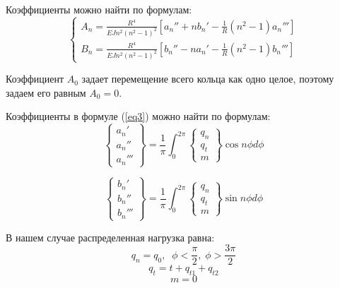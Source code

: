 Коэффициенты можно найти по формулам:
\begin{equation}
    \label{eq3}
    \begin{cases}
        \displaystyle A_n = \frac{R^4}{EJn^2(n^2-1)^2} \left[ a_n'' + nb_n' - \frac{1}{R}(n^2 - 1)a_n''' \right]
        \\[10pt]
        \displaystyle B_n = \frac{R^4}{EJn^2(n^2 - 1)^2} \left[ b_n'' - na_n' - \frac{1}{R}(n^2 - 1)b_n''' \right]
    \end{cases}
\end{equation}

Коэффициент $A_0$ задает перемещение всего кольца как одно целое, поэтому задаем его равным $A_0 = 0$.

Коэффициенты в формуле (\ref{eq3}) можно найти по формулам:
\begin{equation}
    \label{eq4}
    \left\{
        \begin{array}{lr}
            a_n'
            \\
            a_n''
            \\
            a_n'''
        \end{array}
    \right\}
    = \frac{1}{\pi} \int_{0}^{2\pi}
    \left\{ 
        \begin{array}{lr}
            q_n
            \\
            q_t
            \\
            m
        \end{array}
    \right\}
    \cos n \phi d \phi
\end{equation}

\begin{equation}
    \label{eq5}
    \left\{
        \begin{array}{lr}
            b_n'
            \\
            b_n''
            \\
            b_n'''
        \end{array}
    \right\}
    = \frac{1}{\pi} \int_{0}^{2\pi}
    \left\{ 
        \begin{array}{lr}
            q_n
            \\
            q_t
            \\
            m
        \end{array}
    \right\}
    \sin n \phi d \phi
\end{equation}

В нашем случае распределенная нагрузка равна:
\begin{equation}
    \label{eq6}
    q_{n} = q_0, \;\; \phi < \frac{\pi}{2}, \; \phi > \frac{3\pi}{2}
\end{equation}
\begin{equation}
    \label{eq7}
    q_t = t + q_{t1} + q_{t2}
\end{equation}
\begin{equation}
    \label{eq8}
    m = 0
\end{equation}


